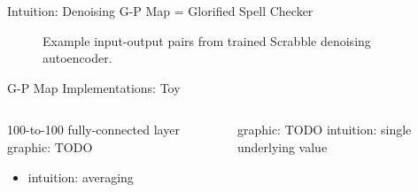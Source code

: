 %
%
%
%
%

\begin{frame}{Intuition: Denoising G-P Map = Glorified Spell Checker}

\begin{figure}

\centering \Huge


%
%
%
%


\vspace{1ex}

\caption{
Example input-output pairs from trained Scrabble denoising autoencoder.
}

\end{figure}

\end{frame}

\begin{frame}{G-P Map Implementations: Toy}

\begin{columns}
\begin{column}{0.5\textwidth}
100-to-100 fully-connected layer
graphic: TODO
\begin{itemize}
\item intuition: averaging
\end{itemize}
\end{column}
\begin{column}{0.5\textwidth}
graphic: TODO
intuition: single underlying value
\end{column}
\end{columns}

\end{frame}
